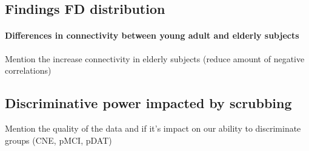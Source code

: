 \documentclass[authoryear]{elsarticle}
\begin{document}
\subsection{Findings FD distribution}

\paragraph{Differences in connectivity between young adult and elderly subjects}
Mention the increase connectivity in elderly subjects (reduce amount of negative correlations)


\subsection{Discriminative power impacted by scrubbing}
Mention the quality of the data and if it's impact on our ability to discriminate groups (CNE, pMCI, pDAT)
\end{document}

